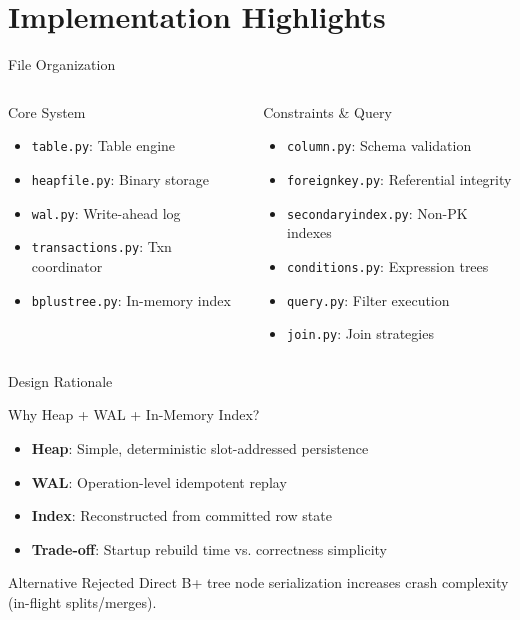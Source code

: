 \documentclass[aspectratio=169]{beamer}
\begin{document}
\section{Implementation Highlights}

\begin{frame}{File Organization}
\begin{columns}
\begin{block}{Core System}
\begin{itemize}
  \item \texttt{table.py}: Table engine
  \item \texttt{heapfile.py}: Binary storage
  \item \texttt{wal.py}: Write-ahead log
  \item \texttt{transactions.py}: Txn coordinator
  \item \texttt{bplustree.py}: In-memory index
\end{itemize}
\end{block}

\begin{block}{Constraints \& Query}
\begin{itemize}
  \item \texttt{column.py}: Schema validation
  \item \texttt{foreignkey.py}: Referential integrity
  \item \texttt{secondaryindex.py}: Non-PK indexes
  \item \texttt{conditions.py}: Expression trees
  \item \texttt{query.py}: Filter execution
  \item \texttt{join.py}: Join strategies
\end{itemize}
\end{block}
\end{columns}
\end{frame}

\begin{frame}{Design Rationale}
\begin{block}{Why Heap + WAL + In-Memory Index?}
\begin{itemize}
  \item \textbf{Heap}: Simple, deterministic slot-addressed persistence
  \item \textbf{WAL}: Operation-level idempotent replay
  \item \textbf{Index}: Reconstructed from committed row state
  \item \textbf{Trade-off}: Startup rebuild time vs. correctness simplicity
\end{itemize}
\end{block}

\begin{alertblock}{Alternative Rejected}
Direct B+ tree node serialization increases crash complexity (in-flight splits/merges).
\end{alertblock}
\end{frame}
\end{document}
